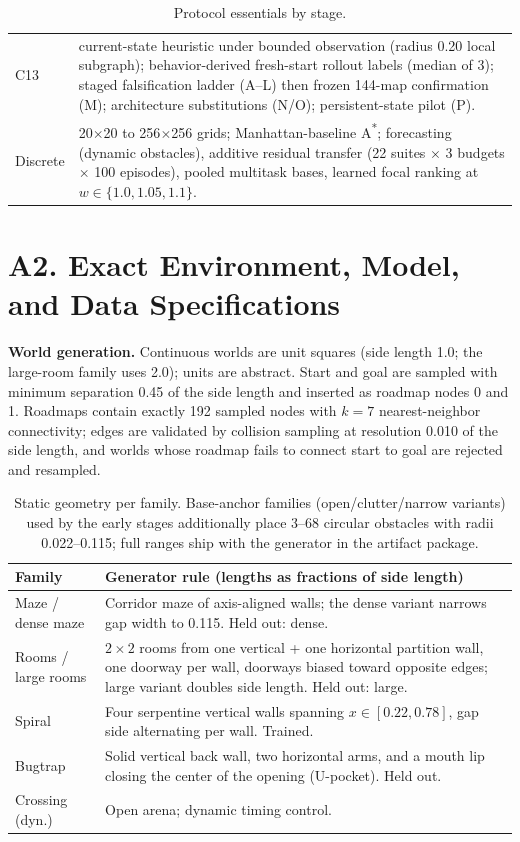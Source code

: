 \documentclass[letterpaper]{article} %
\newcommand{\stage}[1]{\textsc{#1}}
\begin{document}
\begin{table}[h]
\begin{tabular}{@{}lp{5.6cm}@{}}
\stage{C13} & current-state heuristic under bounded observation (radius 0.20 local subgraph); behavior-derived fresh-start rollout labels (median of 3); staged falsification ladder (\stage{A}--\stage{L}) then frozen 144-map confirmation (\stage{M}); architecture substitutions (\stage{N}/\stage{O}); persistent-state pilot (\stage{P}). \\
Discrete & 20$\times$20 to 256$\times$256 grids; Manhattan-baseline A\textsuperscript{*}; forecasting (dynamic obstacles), additive residual transfer (22 suites $\times$ 3 budgets $\times$ 100 episodes), pooled multitask bases, learned focal ranking at $w\in\{1.0,1.05,1.1\}$. \\
\bottomrule
\end{tabular}
\caption{Protocol essentials by stage.}
\label{tab:protocols}
\end{table}

\section{A2. Exact Environment, Model, and Data Specifications}

\textbf{World generation.} Continuous worlds are unit squares (side length 1.0; the large-room family uses 2.0); units are abstract. Start and goal are sampled with minimum separation 0.45 of the side length and inserted as roadmap nodes 0 and 1. Roadmaps contain exactly 192 sampled nodes with $k{=}7$ nearest-neighbor connectivity; edges are validated by collision sampling at resolution 0.010 of the side length, and worlds whose roadmap fails to connect start to goal are rejected and resampled.

\begin{table}[h]
\centering
\scriptsize
\setlength{\tabcolsep}{2.5pt}
\begin{tabular}{@{}lp{5.6cm}@{}}
\toprule
Family & Generator rule (lengths as fractions of side length) \\
\midrule
Maze / dense maze & Corridor maze of axis-aligned walls; the dense variant narrows gap width to 0.115. Held out: dense. \\
Rooms / large rooms & $2{\times}2$ rooms from one vertical + one horizontal partition wall, one doorway per wall, doorways biased toward opposite edges; large variant doubles side length. Held out: large. \\
Spiral & Four serpentine vertical walls spanning $x \in [0.22, 0.78]$, gap side alternating per wall. Trained. \\
Bugtrap & Solid vertical back wall, two horizontal arms, and a mouth lip closing the center of the opening (U-pocket). Held out. \\
Crossing (dyn.) & Open arena; dynamic timing control. \\
\bottomrule
\end{tabular}
\caption{Static geometry per family. Base-anchor families (open/clutter/narrow variants) used by the early stages additionally place 3--68 circular obstacles with radii 0.022--0.115; full ranges ship with the generator in the artifact package.}
\label{tab:envspec}
\end{table}
\end{document}
